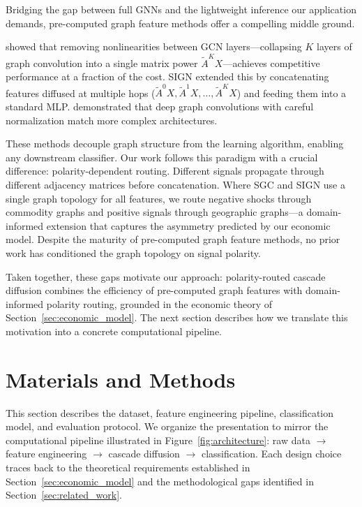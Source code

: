 \documentclass[preprint,12pt,authoryear]{elsarticle}
\begin{document}
Bridging the gap between full GNNs and the lightweight inference our application demands, pre-computed graph feature methods offer a compelling middle ground.

\citet{wu2019sgc} showed that removing nonlinearities between GCN layers---collapsing $K$ layers of graph convolution into a single matrix power $\tilde{A}^K X$---achieves competitive performance at a fraction of the cost. SIGN \citep{rossi2020sign} extended this by concatenating features diffused at multiple hops ($\tilde{A}^0 X, \tilde{A}^1 X, \ldots, \tilde{A}^K X$) and feeding them into a standard MLP. \citet{chen2020simple} demonstrated that deep graph convolutions with careful normalization match more complex architectures.

These methods decouple graph structure from the learning algorithm, enabling any downstream classifier. Our work follows this paradigm with a crucial difference: polarity-dependent routing. Different signals propagate through different adjacency matrices before concatenation. Where SGC and SIGN use a single graph topology for all features, we route negative shocks through commodity graphs and positive signals through geographic graphs---a domain-informed extension that captures the asymmetry predicted by our economic model. Despite the maturity of pre-computed graph feature methods, no prior work has conditioned the graph topology on signal polarity.

Taken together, these gaps motivate our approach: polarity-routed cascade diffusion combines the efficiency of pre-computed graph features with domain-informed polarity routing, grounded in the economic theory of Section~\ref{sec:economic_model}. The next section describes how we translate this motivation into a concrete computational pipeline.


\section{Materials and Methods}
\label{sec:methods}

This section describes the dataset, feature engineering pipeline, classification model, and evaluation protocol. We organize the presentation to mirror the computational pipeline illustrated in Figure~\ref{fig:architecture}: raw data $\to$ feature engineering $\to$ cascade diffusion $\to$ classification. Each design choice traces back to the theoretical requirements established in Section~\ref{sec:economic_model} and the methodological gaps identified in Section~\ref{sec:related_work}.
\end{document}
